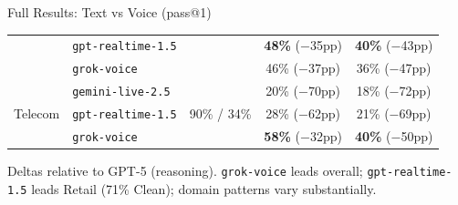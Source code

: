 \documentclass[aspectratio=169]{beamer}
\begin{document}
\begin{frame}{Full Results: Text vs Voice (pass@1)}
\begin{center}
\begin{scriptsize}
\begin{tabular}{@{}llccc@{}}
                             & \texttt{gpt-realtime-1.5} &                              & \textbf{48\%} ($-$35pp) & \textbf{40\%} ($-$43pp) \\
                             & \texttt{grok-voice}       &                              & 46\% ($-$37pp) & 36\% ($-$47pp) \\
    \midrule
    \multirow{3}{*}{Telecom} & \texttt{gemini-live-2.5}  & \multirow{3}{*}{90\% / 34\%} & 20\% ($-$70pp) & 18\% ($-$72pp) \\
                             & \texttt{gpt-realtime-1.5} &                              & 28\% ($-$62pp) & 21\% ($-$69pp) \\
                             & \texttt{grok-voice}       &                              & \textbf{58\%} ($-$32pp) & \textbf{40\%} ($-$50pp) \\
    \bottomrule
  \end{tabular}
  \end{scriptsize}
  \end{center}

  \vspace{0.2em}
  {\scriptsize Deltas relative to GPT-5 (reasoning). \texttt{grok-voice} leads overall; \texttt{gpt-realtime-1.5} leads Retail (71\% Clean); domain patterns vary substantially.}

\end{frame}
\end{document}
